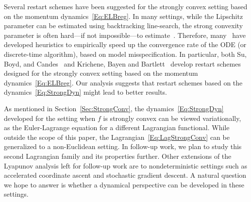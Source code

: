 \documentclass[11pt]{article}
\theoremstyle{plain}
\begin{document}
Several restart schemes have been suggested for the strongly convex setting based on the momentum dynamics~\eqref{Eq:ELBreg}. In many settings,  while the Lipschitz parameter can be estimated using backtracking line-search, the strong convexity parameter is often hard---if not impossible---to estimate~\cite{SuBoydCandes15}.  Therefore, many~\cite{ODonoghue15,SuBoydCandes15,Krichene15} have developed heuristics to empirically speed up the convergence rate of the ODE (or discrete-time algorithm), based on model misspecification. In particular, both Su, Boyd, and Candes~\cite{SuBoydCandes15} and Krichene, Bayen and Bartlett~\cite{Krichene15} develop restart schemes designed for the strongly convex setting based on the momentum dynamics~\eqref{Eq:ELBreg}. Our analysis suggests that restart schemes based on the dynamics~\eqref{Eq:StrongDyn} might lead to better results. 

As mentioned in Section~\ref{Sec:StrongConv}, the dynamics~\eqref{Eq:StrongDyn} developed for the setting when $f$ is strongly convex can be viewed variationally, as the Euler-Lagrange equation for a different Lagrangian functional. %
While outside the scope of this paper, the Lagrangian~\eqref{Eq:LagStrongConv} can be generalized to a non-Euclidean setting. In follow-up work, we plan to study this second Lagrangian family and its properties further. %
Other extensions of the Lyapunov analysis left for follow-up work are to nondeterministic settings such as accelerated coordinate ascent and stochastic gradient descent. A natural question we hope to answer is whether a dynamical perspective can be developed in these settings. 
\end{document}
